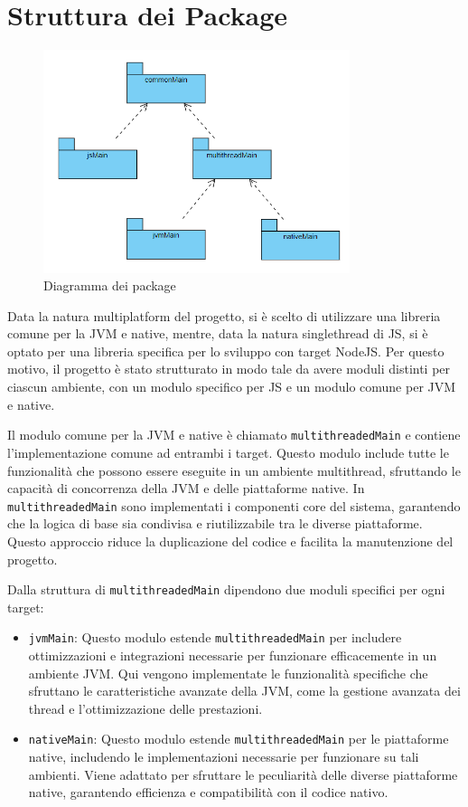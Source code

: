 \documentclass[12pt,a4paper,openright,twoside]{book}
\begin{document}
\section{Struttura dei Package}
\begin{figure}[h]
    \centering
    \includegraphics[width=0.8\textwidth]{figures/package-diagram.png}
    \caption{Diagramma dei package}
    \label{fig:diagramma-package}
\end{figure}

Data la natura multiplatform del progetto, si è scelto di utilizzare una libreria comune per la \ac{JVM} e native, mentre, data la natura singlethread di \ac{JS}, 
si è optato per una libreria specifica per lo sviluppo con target NodeJS. Per questo motivo, il progetto è stato strutturato in modo tale da avere moduli 
distinti per ciascun ambiente, con un modulo specifico per \ac{JS} e un modulo comune per \ac{JVM} e native.

Il modulo comune per la \ac{JVM} e native è chiamato \texttt{multithreadedMain} e contiene l'implementazione comune ad entrambi i target. Questo modulo include tutte 
le funzionalità che possono essere eseguite in un ambiente multithread, sfruttando le capacità di concorrenza della \ac{JVM} e delle piattaforme native. In \texttt{multithreadedMain} 
sono implementati i componenti core del sistema, garantendo che la logica di base sia condivisa e riutilizzabile tra le diverse piattaforme. Questo approccio riduce la duplicazione 
del codice e facilita la manutenzione del progetto.

Dalla struttura di \texttt{multithreadedMain} dipendono due moduli specifici per ogni target:
\begin{itemize}
    \item \texttt{jvmMain}: Questo modulo estende \texttt{multithreadedMain} per includere ottimizzazioni e integrazioni necessarie per funzionare efficacemente in un ambiente \ac{JVM}. Qui vengono implementate le funzionalità specifiche che sfruttano le caratteristiche avanzate della \ac{JVM}, come la gestione avanzata dei thread e l'ottimizzazione delle prestazioni.
    \item \texttt{nativeMain}: Questo modulo estende \texttt{multithreadedMain} per le piattaforme native, includendo le implementazioni necessarie per funzionare su tali ambienti. Viene adattato per sfruttare le peculiarità delle diverse piattaforme native, garantendo efficienza e compatibilità con il codice nativo.
\end{itemize}
\end{document}
